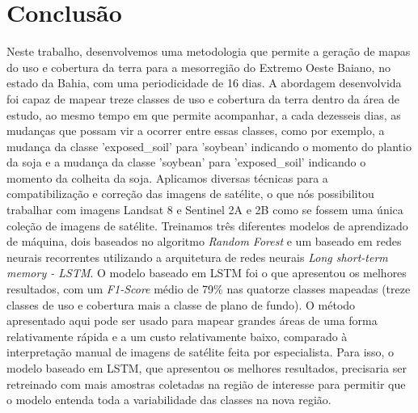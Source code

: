 \chapter{Conclusão}

Neste trabalho, desenvolvemos uma metodologia que permite a geração de mapas do uso e cobertura da terra para a mesorregião do Extremo Oeste Baiano, no estado da Bahia, com uma periodicidade de 16 dias. A abordagem desenvolvida foi capaz de mapear treze classes de uso e cobertura da terra dentro da área de estudo, ao mesmo tempo em que permite acompanhar, a cada dezesseis dias, as mudanças que possam vir a ocorrer entre essas classes, como por exemplo, a mudança da classe 'exposed\_soil' para 'soybean' indicando o momento do plantio da soja e a mudança da classe 'soybean' para 'exposed\_soil' indicando o momento da colheita da soja. Aplicamos diversas técnicas para a compatibilização e correção das imagens de satélite, o que nós possibilitou trabalhar com imagens Landsat 8 e Sentinel 2A e 2B como se fossem uma única coleção de imagens de satélite. Treinamos três diferentes modelos de aprendizado de máquina, dois baseados no algoritmo \textit{Random Forest} e um baseado em redes neurais recorrentes utilizando a arquitetura de redes neurais \textit{Long short-term memory - LSTM}. O modelo baseado em LSTM foi o que apresentou os melhores resultados, com um \textit{F1-Score} médio de 79\% nas quatorze classes mapeadas (treze classes de uso e cobertura mais a classe de plano de fundo). O método apresentado aqui pode ser usado para mapear grandes áreas de uma forma relativamente rápida e a um custo relativamente baixo, comparado à interpretação manual de imagens de satélite feita por especialista. Para isso, o modelo baseado em LSTM, que apresentou os melhores resultados, precisaria ser retreinado com mais amostras coletadas na região de interesse para permitir que o modelo entenda toda a variabilidade das classes na nova região.

\renewcommand{\cleardoublepage}{}
\renewcommand{\clearpage}{}
\vspace{5mm}